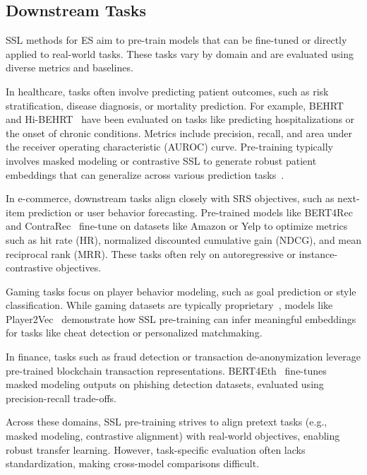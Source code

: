 \documentclass[twoside,11pt]{article}
\begin{document}
\subsection{Downstream Tasks}
SSL methods for ES aim to pre-train models that can be fine-tuned or directly applied to real-world tasks. These tasks vary by domain and are evaluated using diverse metrics and baselines.

In healthcare, tasks often involve predicting patient outcomes, such as risk stratification, disease diagnosis, or mortality prediction. For example, BEHRT~ and Hi-BEHRT~ have been evaluated on tasks like predicting hospitalizations or the onset of chronic conditions. Metrics include precision, recall, and area under the receiver operating characteristic (AUROC) curve. Pre-training typically involves masked modeling or contrastive SSL to generate robust patient embeddings that can generalize across various prediction tasks~.

In e-commerce, downstream tasks align closely with SRS objectives, such as next-item prediction or user behavior forecasting. Pre-trained models like BERT4Rec~ and ContraRec~ fine-tune on datasets like Amazon or Yelp to optimize metrics such as hit rate (HR), normalized discounted cumulative gain (NDCG), and mean reciprocal rank (MRR). These tasks often rely on autoregressive or instance-contrastive objectives.

Gaming tasks focus on player behavior modeling, such as goal prediction or style classification. While gaming datasets are typically proprietary~, models like Player2Vec~ demonstrate how SSL pre-training can infer meaningful embeddings for tasks like cheat detection or personalized matchmaking.

In finance, tasks such as fraud detection or transaction de-anonymization leverage pre-trained blockchain transaction representations. BERT4Eth~ fine-tunes masked modeling outputs on phishing detection datasets, evaluated using precision-recall trade-offs.

Across these domains, SSL pre-training strives to align pretext tasks (e.g., masked modeling, contrastive alignment) with real-world objectives, enabling robust transfer learning. However, task-specific evaluation often lacks standardization, making cross-model comparisons difficult.
\end{document}
